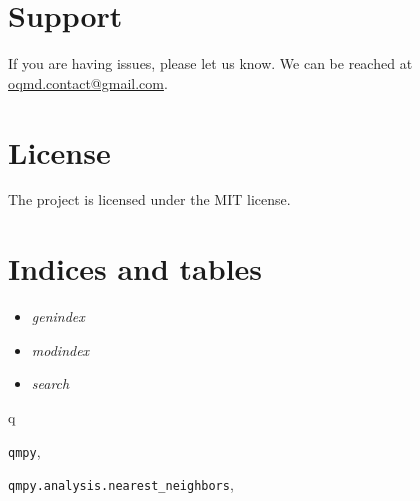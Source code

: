 \documentclass[letterpaper,10pt,english]{sphinxmanual}
\begin{document}
\chapter{Support}
\label{index:support}
If you are having issues, please let us know.
We can be reached at \href{mailto:oqmd.contact@gmail.com}{oqmd.contact@gmail.com}.


\chapter{License}
\label{index:license}
The project is licensed under the MIT license.


\chapter{Indices and tables}
\label{index:indices-and-tables}\begin{itemize}
\item {} 
\emph{genindex}

\item {} 
\emph{modindex}

\item {} 
\emph{search}

\end{itemize}


\renewcommand{\indexname}{Python Module Index}
\begin{theindex}
\def\bigletter#1{{\Large\sffamily#1}\nopagebreak\vspace{1mm}}
\bigletter{q}
\item {\texttt{qmpy}}, \pageref{models:module-qmpy}
\item {\texttt{qmpy.analysis.nearest\_neighbors}}, \pageref{models:module-qmpy.analysis.nearest_neighbors}
\end{theindex}

\renewcommand{\indexname}{Index}
\printindex
\end{document}
